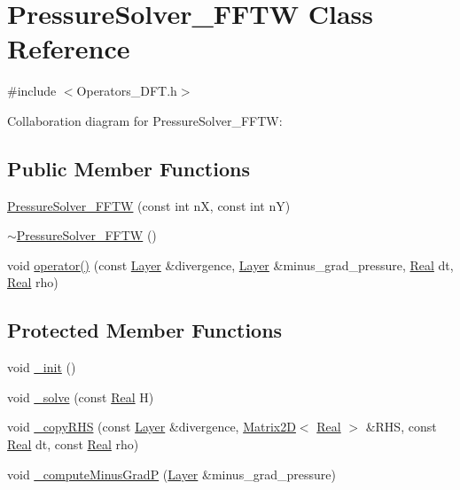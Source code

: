 \hypertarget{class_pressure_solver___f_f_t_w}{}\section{Pressure\+Solver\+\_\+\+F\+F\+T\+W Class Reference}
\label{class_pressure_solver___f_f_t_w}


{\ttfamily \#include $<$Operators\+\_\+\+D\+F\+T.\+h$>$}



Collaboration diagram for Pressure\+Solver\+\_\+\+F\+F\+T\+W\+:
\subsection*{Public Member Functions}
\begin{DoxyCompactItemize}
\item 
\hyperlink{class_pressure_solver___f_f_t_w_ac54b726cacfeec644685f98722f6480c}{Pressure\+Solver\+\_\+\+F\+F\+T\+W} (const int n\+X, const int n\+Y)
\item 
\hyperlink{class_pressure_solver___f_f_t_w_ab241e86be401eb5471d610f39c3a7a74}{$\sim$\+Pressure\+Solver\+\_\+\+F\+F\+T\+W} ()
\item 
void \hyperlink{class_pressure_solver___f_f_t_w_ae44fe0bfd308ae294dbe0f61d9b43a20}{operator()} (const \hyperlink{struct_layer}{Layer} \&divergence, \hyperlink{struct_layer}{Layer} \&minus\+\_\+grad\+\_\+pressure, \hyperlink{_h_d_f5_dumper_8h_a445a5f0e2a34c9d97d69a3c2d1957907}{Real} dt, \hyperlink{_h_d_f5_dumper_8h_a445a5f0e2a34c9d97d69a3c2d1957907}{Real} rho)
\end{DoxyCompactItemize}
\subsection*{Protected Member Functions}
\begin{DoxyCompactItemize}
\item 
void \hyperlink{class_pressure_solver___f_f_t_w_a009887d2dd55f2fa8bfa051d0fc8a2ed}{\+\_\+init} ()
\item 
void \hyperlink{class_pressure_solver___f_f_t_w_a032ca9b43334ac12d0d8c0458ba72552}{\+\_\+solve} (const \hyperlink{_h_d_f5_dumper_8h_a445a5f0e2a34c9d97d69a3c2d1957907}{Real} H)
\item 
void \hyperlink{class_pressure_solver___f_f_t_w_acdc7db3a11b1f99c30258dab37b6e5f1}{\+\_\+copy\+R\+H\+S} (const \hyperlink{struct_layer}{Layer} \&divergence, \hyperlink{class_matrix2_d}{Matrix2\+D}$<$ \hyperlink{_h_d_f5_dumper_8h_a445a5f0e2a34c9d97d69a3c2d1957907}{Real} $>$ \&R\+H\+S, const \hyperlink{_h_d_f5_dumper_8h_a445a5f0e2a34c9d97d69a3c2d1957907}{Real} dt, const \hyperlink{_h_d_f5_dumper_8h_a445a5f0e2a34c9d97d69a3c2d1957907}{Real} rho)
\item 
void \hyperlink{class_pressure_solver___f_f_t_w_aa87807f7855704655feb6d7ed13ae922}{\+\_\+compute\+Minus\+Grad\+P} (\hyperlink{struct_layer}{Layer} \&minus\+\_\+grad\+\_\+pressure)
\end{DoxyCompactItemize}
